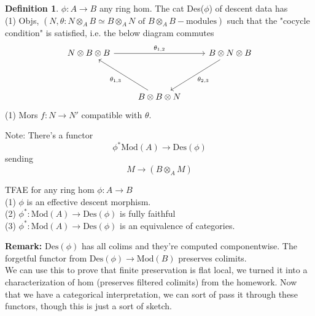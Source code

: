 \documentclass{article}
\theoremstyle{definition}
\theoremstyle{definition}
\newtheorem{definition}{Definition}[section]
\theoremstyle{remark}
\begin{document}
\begin{definition}
	$\phi:A \to B$ any ring hom. The cat Des($\phi$) of descent data has \\
	\indent (1) Objs, $(N, \theta: N \otimes_A B \simeq B \otimes_A N \text{ of } B \otimes_A B-\text{modules})$ such that the "cocycle condition" is satisfied, i.e. the below diagram commutes
\[\begin{tikzcd}
	{N \otimes B \otimes B} && {B \otimes N \otimes B} \\
	\\
	& {B \otimes B \otimes N}
	\arrow["{\theta_{1,2}}", from=1-1, to=1-3]
	\arrow["{\theta_{2,3}}", from=1-3, to=3-2]
	\arrow["{\theta_{1,3}}", from=3-2, to=1-1]
\end{tikzcd}\]
\indent (1) Mors $f: N \to N'$ compatible with $\theta$.
\end{definition}

Note: There's a functor 
\[\phi^* \text{Mod}(A) \to \text{Des}(\phi)\]
sending 
\[M \to (B \otimes_A M)\]
\begin{theo}{}{}
	TFAE for any ring hom $\phi: A \to B$\\
	\indent (1) $\phi$ is an effective descent morphism.\\
	\indent (2) $\phi^*: \text{Mod}(A) \to \text{Des}(\phi)$ is fully faithful\\
	\indent (3) $\phi^*: \text{Mod}(A) \to \text{Des}(\phi)$ is an equivalence of categories.
\end{theo}

\textbf{Remark:} $\text{Des}(\phi)$ has all colims and they're computed componentwise.
The forgetful functor from $\text{Des}(\phi) \to \text{Mod}(B)$ preserves colimits.\\

We can use this to prove that finite preservation is flat local, we turned it into a characterization of hom (preserves filtered colimits) from the homework.
Now that we have a categorical interpretation, we can sort of pass it through these functors, though this is just a sort of sketch.\\
\end{document}

